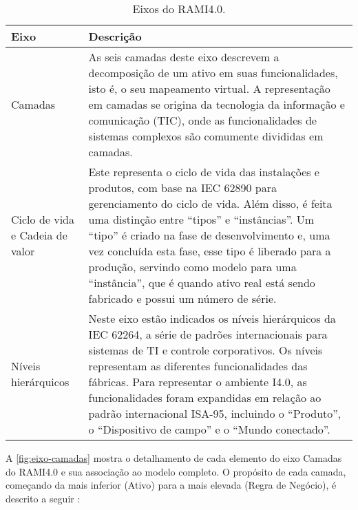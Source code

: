 \begin{table}[t]
	\centering
	\footnotesize
	\caption{Eixos do RAMI4.0.}
	\label{tab:rami-eixos}
	\begin{tabular}{p{3cm}p{12cm}}
		\hline
		\textbf{Eixo} & \textbf{Descrição}                                                                                                                                                                                                                                                                                                                                                                                                                      \\

		\hline
		Camadas
		              & As seis camadas deste eixo descrevem a decomposição de um ativo em suas funcionalidades, isto é, o seu mapeamento virtual. A representação em camadas se origina da tecnologia da informação e comunicação (TIC), onde as funcionalidades de sistemas complexos são comumente divididas em camadas.                                                                                                                                     \\

		\hline
		Ciclo de vida e Cadeia de valor
		              & Este representa o ciclo de vida das instalações e produtos, com base na IEC 62890 para gerenciamento do ciclo de vida. Além disso, é feita uma distinção entre ``tipos'' e ``instâncias''. Um ``tipo'' é criado na fase de desenvolvimento e, uma vez concluída esta fase, esse tipo é liberado para a produção, servindo como modelo para uma ``instância'', que é quando ativo real está sendo fabricado e possui um número de série. \\

		\hline
		Níveis hierárquicos
		              & Neste eixo estão indicados os níveis hierárquicos da IEC 62264, a série de padrões internacionais para sistemas de TI e controle corporativos. Os níveis representam as diferentes funcionalidades das fábricas. Para representar o ambiente I4.0, as funcionalidades foram expandidas em relação ao padrão internacional ISA-95, incluindo o ``Produto'', o ``Dispositivo de campo'' e o ``Mundo conectado''.                          \\
		\hline
	\end{tabular}
\end{table}

A \autoref{fig:eixo-camadas} mostra o detalhamento de cada elemento do eixo Camadas do RAMI4.0 e sua associação ao modelo completo. O propósito de cada camada, começando da mais inferior (Ativo) para a mais elevada (Regra de Negócio), é descrito a seguir \cite{bitkom2016implementation}:

